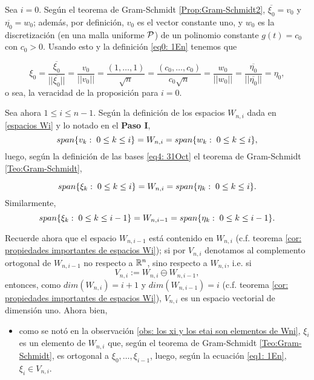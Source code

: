 \begin{itemize}
Sea $i=0$. Según el teorema de Gram-Schmidt
\ref{Prop:Gram-Schmidt2}, $\overline{\xi_{0}}=v_{0}$
y $\overline{\eta_{0}}=w_{0}$; además,
por definición, $v_{0}$ es
el vector constante uno, y
$w_{0}$ es la discretización (en una malla uniforme $\mathcal{P}$)
de un polinomio constante $g(t)=c_{0}$ con $c_{0}>0$.
Usando esto y la definición \eqref{eq0: 1En}
tenemos que

\[
\xi_{0}=
\frac{\overline{\xi_{0}}}{||\overline{\xi_{0}}||}=
\frac{v_{0}}{||v_{0}||}=\frac{(1, \ldots , 1)}{\sqrt{n}}=
\frac{(c_{0}, \ldots , c_{0})}{c_{0}\sqrt{n}}= \frac{w_{0}}{||w_{0}||}=
\frac{\overline{\eta_{0}}}{||\overline{\eta_{0}}||}=\eta_{0},
\]
o sea, la veracidad de la proposición para $i=0$.



Sea ahora $1 \leq i \leq n-1$.
Según la definición de los espacios
$W_{n,i}$ dada en \eqref{espacios Wi}
y lo notado en el \textbf{Paso I},
\[
span\{ v_{k}: \hspace{0.1cm} 0 \leq k \leq i \}=W_{n,i}=
span\{ w_{k}: \hspace{0.1cm} 0 \leq k \leq i \},
\]
luego, según la definición de las bases
\eqref{eq4: 31Oct}
el teorema de Gram-Schmidt
\ref{Teo:Gram-Schmidt},

\[
span\{ \xi_{k}: \hspace{0.1cm} 0 \leq k \leq i \}=
W_{n,i} =span\{ \eta_{k}: \hspace{0.1cm} 0 \leq k \leq i \}.
\]
\noindent
Similarmente,
\[
span\{ \xi_{k}: \hspace{0.1cm} 0 \leq k \leq i-1 \}=
W_{n,i-1} =span\{ \eta_{k}: \hspace{0.1cm} 0 \leq k \leq i-1 \}.
\]

Recuerde ahora que el espacio $W_{n,i-1}$
está contenido en $W_{n,i}$
(c.f. teorema \ref{cor: propiedades importantes de espacios Wi});
si por $V_{n,i}$ denotamos al complemento ortogonal de $W_{n,i-1}$
no respecto a $\mathbb{R}^{n}$, sino 
respecto a $W_{n,i}$, i.e. si
\begin{equation}
\label{eq1: 1En}
V_{n,i} := W_{n,i} \ominus W_{n,i-1},
\end{equation}
entonces, como 
$dim(W_{n,i})=i+1$ y $dim(W_{n,i-1})=i$
(c.f. teorema \ref{cor: propiedades importantes de espacios Wi}), 
$V_{n,i}$ es un espacio
vectorial de dimensión uno. Ahora bien,

\begin{itemize}
\item como se notó en la observación 
\ref{obs: los xi y los etai son elementos de Wni},
$\xi_{i}$ es un elemento de $W_{n,i}$ que,
según el teorema de Gram-Schmidt \ref{Teo:Gram-Schmidt},
es ortogonal
a $\xi_{0}, \ldots , \xi_{i-1}$, luego, 
según la ecuación \eqref{eq1: 1En},
$\xi_{i} \in V_{n,i}$.


\end{itemize}
\end{itemize}
